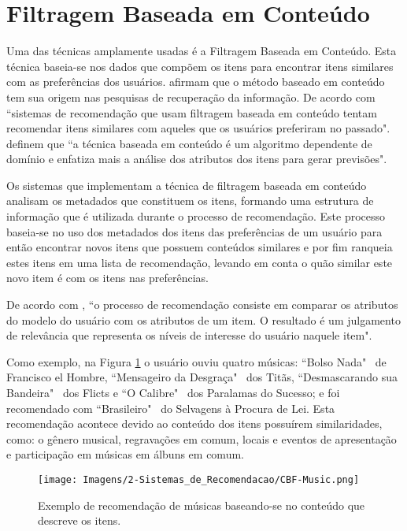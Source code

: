 \section{Filtragem Baseada em Conteúdo}
Uma das técnicas amplamente usadas é a Filtragem Baseada em Conteúdo. Esta técnica baseia-se nos dados que compõem os itens para encontrar itens similares com as preferências dos usuários.  afirmam que o método baseado em conteúdo tem sua origem nas pesquisas de recuperação da informação. De acordo com  ``sistemas de recomendação que usam filtragem baseada em conteúdo tentam recomendar itens similares com aqueles que os usuários preferiram no passado".  definem que ``a técnica baseada em conteúdo é um algoritmo dependente de domínio e enfatiza mais a análise dos atributos dos itens para gerar previsões".

Os sistemas que implementam a técnica de filtragem baseada em conteúdo analisam os metadados que constituem os itens, formando uma estrutura de informação que é utilizada durante o processo de recomendação. Este processo baseia-se no uso dos metadados dos itens das preferências de um usuário para então encontrar novos itens que possuem conteúdos similares e por fim ranqueia estes itens em uma lista de recomendação, levando em conta o quão similar este novo item é com os itens nas preferências.

De acordo com , ``o processo de recomendação consiste em comparar os atributos do modelo do usuário com os atributos de um item. O resultado é um julgamento de relevância que representa os níveis de interesse do usuário naquele item". 

Como exemplo, na Figura \ref{fig:cbf_music} o usuário ouviu quatro músicas: ``Bolso Nada"~ de Francisco el Hombre, ``Mensageiro da Desgraça"~ dos Titãs, ``Desmascarando sua Bandeira"~ dos Flicts e ``O Calibre"~ dos Paralamas do Sucesso; e foi recomendado com ``Brasileiro"~ do Selvagens à Procura de Lei. Esta recomendação acontece devido ao conteúdo dos itens possuírem similaridades, como: o gênero musical, regravações em comum, locais e eventos de apresentação e participação em músicas em álbuns em comum.

\begin{figure}[hbt!]
    \centering
    \texttt{[image: Imagens/2-Sistemas\_de\_Recomendacao/CBF-Music.png]}
    \caption{Exemplo de recomendação de músicas baseando-se no conteúdo que descreve os itens.}
    \label{fig:cbf_music}
\end{figure}


